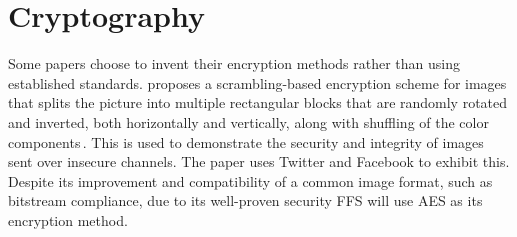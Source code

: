 \section{Cryptography}
Some papers choose to invent their encryption methods rather than using established standards. \citeauthor{chumanEncryptionThenCompressionSystemsUsing2019} proposes a scrambling-based encryption scheme for images that splits the picture into multiple rectangular blocks that are randomly rotated and inverted, both horizontally and vertically, along with shuffling of the color components\,\cite{chumanEncryptionThenCompressionSystemsUsing2019}. This is used to demonstrate the security and integrity of images sent over insecure channels. The paper uses Twitter and Facebook to exhibit this. Despite its improvement and compatibility of a common image format, such as bitstream compliance, due to its well-proven security FFS will use AES as its encryption method. 